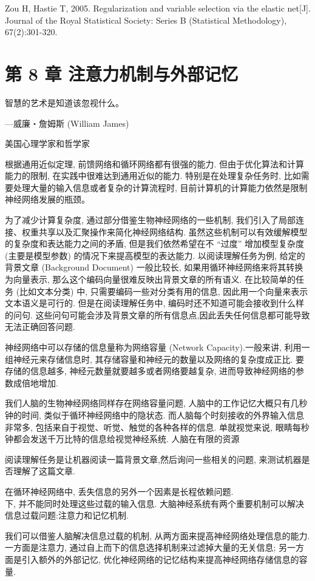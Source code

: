 \documentclass[10pt]{article}
\begin{document}
Zou H, Hastie T, 2005. Regularization and variable selection via the elastic net[J]. Journal of the Royal Statistical Society: Series B (Statistical Methodology), 67(2):301-320.

\section*{第 8 章 注意力机制与外部记忆}
智慧的艺术是知道该忽视什么。

—威廉・詹姆斯 (William James)

美国心理学家和哲学家

根据通用近似定理, 前馈网络和循环网络都有很强的能力. 但由于优化算法和计算能力的限制, 在实践中很难达到通用近似的能力. 特别是在处理复杂任务时, 比如需要处理大量的输入信息或者复杂的计算流程时, 目前计算机的计算能力依然是限制神经网络发展的瓶颈。

为了减少计算复杂度, 通过部分借鉴生物神经网络的一些机制, 我们引入了局部连接、权重共享以及汇聚操作来简化神经网络结构. 虽然这些机制可以有效缓解模型的复杂度和表达能力之间的矛盾, 但是我们依然希望在不 “过度” 增加模型复杂度 (主要是模型参数) 的情况下来提高模型的表达能力. 以阅读理解任务为例, 给定的背景文章 (Background Document) 一般比较长, 如果用循环神经网络来将其转换为向量表示, 那么这个编码向量很难反映出背景文章的所有语义. 在比较简单的任务 (比如文本分类) 中, 只需要编码一些对分类有用的信息, 因此用一个向量来表示文本语义是可行的. 但是在阅读理解任务中, 编码时还不知道可能会接收到什么样的问句. 这些问句可能会涉及背景文章的所有信息点,因此丢失任何信息都可能导致无法正确回答问题.

神经网络中可以存储的信息量称为网络容量 (Network Capacity).一般来讲, 利用一组神经元来存储信息时, 其存储容量和神经元的数量以及网络的复杂度成正比. 要存储的信息越多, 神经元数量就要越多或者网络要越复杂, 进而导致神经网络的参数成倍地增加.

我们人脑的生物神经网络同样存在网络容量问题, 人脑中的工作记忆大概只有几秒钟的时间, 类似于循环神经网络中的隐状态. 而人脑每个时刻接收的外界输入信息非常多, 包括来自于视觉、听觉、触觉的各种各样的信息. 单就视觉来说, 眼睛每秒钟都会发送千万比特的信息给视觉神经系统. 人脑在有限的资源

阅读理解任务是让机器阅读一篇背景文章,然后询问一些相关的问题, 来测试机器是否理解了这篇文章.

在循环神经网络中, 丢失信息的另外一个因素是长程依赖问题.\\
下, 并不能同时处理这些过载的输入信息. 大脑神经系统有两个重要机制可以解决信息过载问题:注意力和记忆机制.

我们可以借鉴人脑解决信息过载的机制, 从两方面来提高神经网络处理信息的能力. 一方面是注意力, 通过自上而下的信息选择机制来过滤掉大量的无关信息; 另一方面是引入额外的外部记忆, 优化神经网络的记忆结构来提高神经网络存储信息的容量.
\end{document}
